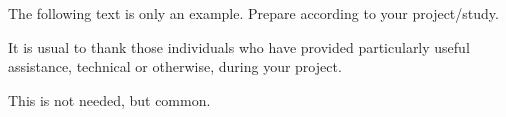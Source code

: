 {\color{red}The following text is only an example. Prepare according to your project/study.}
\medskip

It is usual to thank those individuals who have provided particularly useful assistance, technical or otherwise, during your project.

This is not needed, but common.